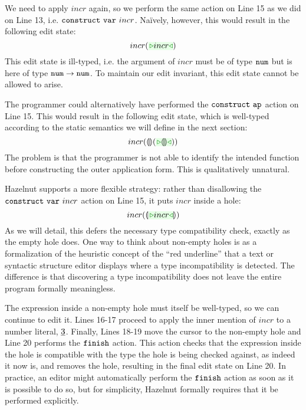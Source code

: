 We need to apply $incr$ again, so we perform the same action on Line 15 as we did on Line 13, i.e. $\mathtt{construct}~\mathtt{var}~incr$. Na\"ively, however, this would result in the following edit state: 
\[
incr(\zwsel{incr})
\]
This edit state is ill-typed, i.e. the argument of $incr$ must be of type $\texttt{num}$ but is here of type $\texttt{num} \rightarrow \texttt{num}$. To maintain our edit invariant, this edit state cannot be allowed to arise. 

The programmer could alternatively have performed the $\mathtt{construct}~\mathtt{ap}$ action on Line 15. This would result in the following edit state, which is well-typed according to the static semantics we will define in the next section:
\[
incr(\hhole{}(\zwsel{\hhole{}}))
\]
The problem is that the programmer is not able to identify the intended function before constructing the outer application form. This is qualitatively unnatural.

Hazelnut supports a more flexible strategy: rather than disallowing the $\mathtt{construct}~\mathtt{var}~incr$ action on Line 15, it puts $incr$ inside a hole:
\[
incr(\hhole{\zwsel{incr}})
\]
As we will detail, this defers the necessary type compatibility check, exactly as the empty hole does. One way to think about non-empty holes is as a formalization of the heuristic concept of the ``red underline'' that a text or syntactic structure editor displays where a type incompatibility is detected. The difference is that discovering a type incompatibility does not leave the entire program formally meaningless.

The expression inside a non-empty hole must itself be well-typed, so we can continue to edit it. Lines 16-17 proceed to apply the inner mention of $incr$ to a number literal, $\underline{3}$. Finally, Lines 18-19 move the cursor to the non-empty hole and Line 20 performs the $\mathtt{finish}$ action. This action checks that the expression inside the hole is compatible with the type the hole is being checked against, as indeed it now is, and removes the hole, resulting in the final edit state on Line 20. In practice, an editor might automatically perform the $\mathtt{finish}$ action as soon as it is possible to do so, but for simplicity, Hazelnut formally requires that it be performed explicitly.



